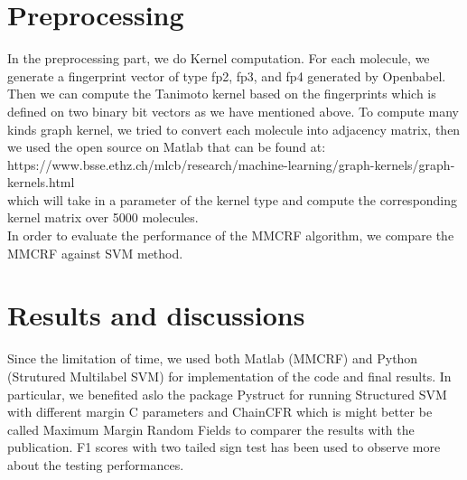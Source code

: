 \documentclass[12pt]{article}
\begin{document}
\section{Preprocessing}
In the preprocessing part, we do Kernel computation. 
For each molecule, we generate a fingerprint vector of type fp2, fp3, and fp4 generated by Openbabel. Then we can compute the Tanimoto kernel based on the fingerprints which is defined on two binary bit vectors as we have mentioned above. To compute many kinds graph kernel, we tried to convert each molecule into adjacency matrix, then we used the open source on Matlab that can be found at: https://www.bsse.ethz.ch/mlcb/research/machine-learning/graph-kernels/graph-kernels.html \\which will take in a parameter of the kernel type and compute the corresponding kernel matrix over 5000 molecules.\\
In order to evaluate the performance of the MMCRF algorithm, we compare the MMCRF against SVM method.
\section{Results and discussions}

Since the limitation of time, we used both Matlab (MMCRF) and Python (Strutured Multilabel SVM) for implementation of the code and final results. In particular, we benefited aslo the package Pystruct for running Structured SVM with different margin C parameters and ChainCFR which is might better be called Maximum Margin Random Fields to comparer the results with the publication. F1 scores with two tailed sign test has been used to observe more about the testing performances. 
\end{document}
